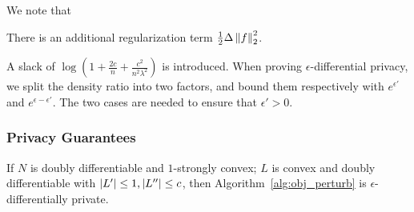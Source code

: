\documentclass{article} %
\begin{document}
We note that \begin{enumerate*}[label=(\roman*)]
\item There is an additional regularization term $\frac{1}{2}\Delta \left\lVert f\right\rVert_2^2$.
\item A slack of $\log{(1 + \frac{2c}{n} + \frac{c^2}{n^2\lambda^2})}$ is introduced. When proving $\epsilon$-differential privacy, we split the density ratio into two factors, and bound them respectively with $e^{\epsilon'}$ and $e^{\epsilon - \epsilon'}$. The two cases are needed to ensure that $\epsilon' > 0$.
\end{enumerate*}

\subsubsection{Privacy Guarantees}
\begin{theorem}
If $N$ is doubly differentiable and $1$-strongly convex; $L$ is convex and doubly differentiable with $\left\lvert L'\right\rvert \le 1, \left\lvert L''\right\rvert \le c$, then Algorithm~\ref{alg:obj_perturb} is $\epsilon$-differentially private.
\end{theorem}
\end{document}
